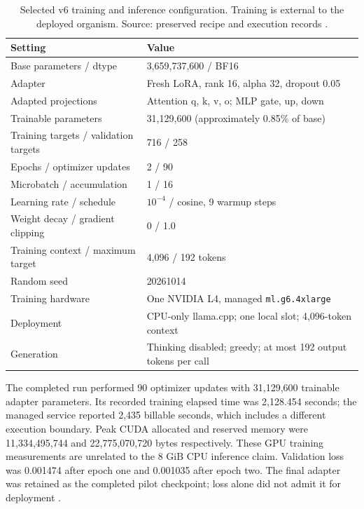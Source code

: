 \documentclass[11pt,letterpaper]{article}
\begin{document}
\begin{table}[htbp]
\centering\small
\caption{Selected v6 training and inference configuration. Training is external
to the deployed organism. Source: preserved recipe and execution records
\cite{training,implementation}.}
\label{tab:training}
\begin{tabular}{@{}p{}p{}@{}}
\toprule
Setting & Value\\
\midrule
Base parameters / dtype & 3,659,737,600 / BF16\\
Adapter & Fresh LoRA, rank 16, alpha 32, dropout 0.05\\
Adapted projections & Attention q, k, v, o; MLP gate, up, down\\
Trainable parameters & 31,129,600 (approximately 0.85\% of base)\\
Training targets / validation targets & 716 / 258\\
Epochs / optimizer updates & 2 / 90\\
Microbatch / accumulation & 1 / 16\\
Learning rate / schedule & $10^{-4}$ / cosine, 9 warmup steps\\
Weight decay / gradient clipping & 0 / 1.0\\
Training context / maximum target & 4,096 / 192 tokens\\
Random seed & 20261014\\
Training hardware & One NVIDIA L4, managed \texttt{ml.g6.4xlarge}\\
Deployment & CPU-only llama.cpp; one local slot; 4,096-token context\\
Generation & Thinking disabled; greedy; at most 192 output tokens per call\\
\bottomrule
\end{tabular}
\end{table}

The completed run performed 90 optimizer updates with 31,129,600 trainable
adapter parameters. Its recorded training elapsed time was 2,128.454 seconds;
the managed service reported 2,435 billable seconds, which includes a different
execution boundary. Peak CUDA allocated and reserved memory were
11,334,495,744 and 22,775,070,720 bytes respectively. These GPU training
measurements are unrelated to the 8 GiB CPU inference claim.
Validation loss was 0.001474 after epoch one and 0.001035 after epoch two.
The final adapter was retained as the completed pilot checkpoint; loss alone
did not admit it for deployment \cite{training}.
\end{document}
